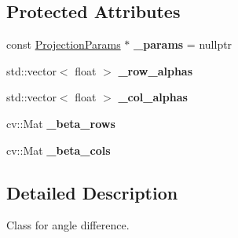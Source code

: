 \subsection*{Protected Attributes}
\begin{DoxyCompactItemize}
\item 
\mbox{\label{classdepth__clustering_1_1AngleDiffPrecomputed_ac37e01df194d9063b7e7bd1f7b7aa6a4}} 
const \hyperlink{classdepth__clustering_1_1ProjectionParams}{Projection\+Params} $\ast$ {\bfseries \+\_\+params} = nullptr
\item 
\mbox{\label{classdepth__clustering_1_1AngleDiffPrecomputed_a2ba86b3ed5f12c2a7e2e8beef81bd88d}} 
std\+::vector$<$ float $>$ {\bfseries \+\_\+row\+\_\+alphas}
\item 
\mbox{\label{classdepth__clustering_1_1AngleDiffPrecomputed_a90f6e3fd2f4b585c2cd03809f3818ee9}} 
std\+::vector$<$ float $>$ {\bfseries \+\_\+col\+\_\+alphas}
\item 
\mbox{\label{classdepth__clustering_1_1AngleDiffPrecomputed_a2df8751352e4621cb69743801e151b75}} 
cv\+::\+Mat {\bfseries \+\_\+beta\+\_\+rows}
\item 
\mbox{\label{classdepth__clustering_1_1AngleDiffPrecomputed_ae7faa81ea82d0ff9f75f8a1e63659ced}} 
cv\+::\+Mat {\bfseries \+\_\+beta\+\_\+cols}
\end{DoxyCompactItemize}


\subsection{Detailed Description}
Class for angle difference. 

